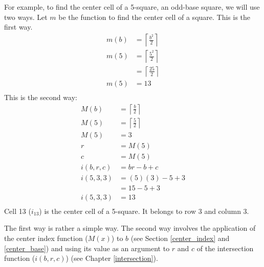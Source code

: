 \documentclass[letterpaper, twoside,12pt]{book}
\begin{document}
    For example, to find the center cell of a 5-square, an odd-base square, we will use two ways. Let $m$ be the function to find the center cell of a square. This is the first way.
    \begin{equation}
        \begin{split}
            m(b) &= \left\lceil \frac{b^2}{2} \right\rceil \\
            m(5) &= \left\lceil \frac{5^2}{2} \right\rceil \\
                &= \left\lceil \frac{25}{2} \right\rceil \\
            m(5) &= 13 \\
        \end{split}
    \end{equation}
    This is the second way:
    \begin{equation}
        \begin{split}
            M(b) &= \left\lceil \frac{b}{2} \right\rceil \\
            M(5) &= \left\lceil \frac{5}{2} \right\rceil \\
            M(5) &= 3 \\
            r &= M(5) \\
            c &= M(5) \\
            i(b,r,c) &= br - b + c \\
            i(5,3,3) &= (5)(3) - 5 + 3 \\
                &= 15 - 5 + 3 \\
            i(5,3,3) &= 13 \\
        \end{split}
    \end{equation}
    Cell 13 ($i_{13}$) is the center cell of a 5-square. It belongs to row 3 and column 3.

    \newpage

    The first way is rather a simple way. The second way involves the application of the center index function ($M(x)$) to $b$ (see Section \ref{center_index} and \ref{center_base}) and using its value as an argument to $r$ and $c$ of the intersection function ($i(b,r,c)$) (see Chapter \ref{intersection}).
\end{document}
